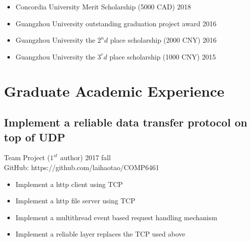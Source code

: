 \documentclass[11pt,a4paper,sans]{moderncv}
\begin{document}
\begin{itemize}

\item Concordia University Merit Scholarship (5000 CAD) \hfill 2018
\vspace{4pt}

\item Guangzhou University outstanding graduation project award \hfill 2016
\vspace{4pt}

\item Guangzhou University the $2^nd$ place scholarship (2000 CNY) \hfill 2016
\vspace{4pt}

\item Guangzhou University the $3^rd$ place scholarship (1000 CNY) \hfill 2015
\vspace{4pt}
\end{itemize}

\section{Graduate Academic Experience}

\subsection{Implement a reliable data transfer protocol on top of UDP}
Team Project ($1^{st}$ author) \hfill 2017 fall \\
GitHub: https://github.com/laihaotao/COMP6461
\vspace{4pt}
\begin{itemize}
\item Implement a http client using TCP
\item Implement a http file server using TCP
\item Implement a multithread event based request handling mechanism
\item Implement a reliable layer replaces the TCP used above
\end{itemize}
\end{document}

